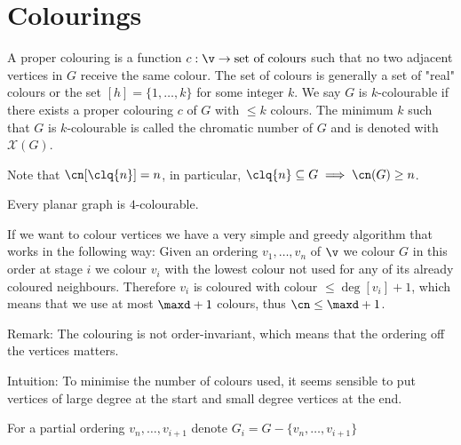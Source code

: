 \chapter{Colourings}
A proper colouring is a function $c: \v \rightarrow \text{set of colours}$ such that no two adjacent vertices in $G$ receive the same colour. The set of colours is generally a set of "real" colours or the set $[h] = \{1, \dots, k\}$ for some integer $k$. We say $G$ is $k$-colourable if there exists a proper colouring $c$ of $G$ with $\leq k$ colours. The minimum $k$ such that $G$ is $k$-colourable is called the chromatic number of $G$ and is denoted with $\mathcal{X}(G)$.

Note that $\cn[\clq{n}] = n$, in particular, $\clq{n} \subseteq G \implies \cn(G) \geq n$.
\begin{customtheorem}{6.1}
\label{theorem:6.1}
    Every planar graph is $4$-colourable.
\end{customtheorem}
If we want to colour vertices we have a very simple and greedy algorithm that works in the following way: Given an ordering $v_1, \dots, v_n$ of $\v$ we colour $G$ in this order at stage $i$ we colour $v_i$ with the lowest colour not used for any of its already coloured neighbours. Therefore $v_i$ is coloured with colour $\leq \deg[v_i] + 1$, which means that we use at most $\maxd + 1$ colours, thus $\cn \leq \maxd + 1$.

Remark: The colouring is not order-invariant, which means that the ordering off the vertices matters.

Intuition: To minimise the number of colours used, it seems sensible to put vertices of large degree at the start and small degree vertices at the end.

For a partial ordering $v_n, \dots, v_{i + 1}$ denote $G_i = G - \{v_n, \dots, v_{i + 1}\}$

